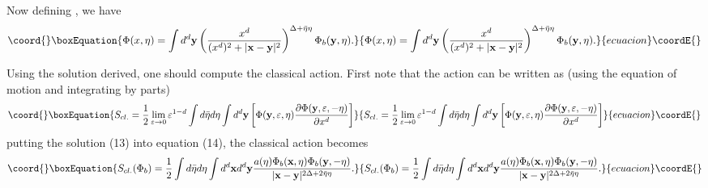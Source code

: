 \documentclass[a4paper,11pt]{article}
\begin{document}
Now defining
\coordHE{}, we have
\begin{equation}\coord{}\boxEquation{
\Phi(x,\eta)=\int d^d \mathbf{y}
\left(\frac{x^d}{(x^d)^2+|\mathbf{x-y}|^2} \right)^
{\Delta+\bar{\eta}\eta} \Phi_b(\mathbf{y},\eta).
}{
\Phi(x,\eta)=\int d^d \mathbf{y}
\left(\frac{x^d}{(x^d)^2+|\mathbf{x-y}|^2} \right)^
{\Delta+\bar{\eta}\eta} \Phi_b(\mathbf{y},\eta).
}{ecuacion}\coordE{}\end{equation}

Using the solution derived, one should compute the classical action. First
note that the action can be written as (using the equation of motion and
integrating by parts)
\begin{equation}\coord{}\boxEquation{  \label{j}
S_{cl.}=\frac{1}{2} \lim_{\varepsilon\rightarrow 0}
\varepsilon^{1-d} \int d \bar{\eta}d \eta \int d^d \mathbf{y}
\left[\Phi(\mathbf{y},\varepsilon,\eta) \frac{\partial
\Phi(\mathbf{y},\varepsilon,-\eta)}{\partial x^d}\right]
}{  S_{cl.}=\frac{1}{2} \lim_{\varepsilon\rightarrow 0}
\varepsilon^{1-d} \int d \bar{\eta}d \eta \int d^d \mathbf{y}
\left[\Phi(\mathbf{y},\varepsilon,\eta) \frac{\partial
\Phi(\mathbf{y},\varepsilon,-\eta)}{\partial x^d}\right]
}{ecuacion}\coordE{}\end{equation}
putting the solution (13) into equation (14), the classical
action becomes
\begin{equation}\coord{}\boxEquation{  \label{dd}
S_{cl.}(\Phi_b)=\frac{1}{2}\int d \bar{\eta}d \eta \int d^d
\mathbf{x} d^d \mathbf{y} \frac{a(\eta)
\Phi_b(\mathbf{x},\eta)\Phi_b(\mathbf{y},-\eta)}{|
\mathbf{x-y}|^{2\Delta+2\bar{\eta}\eta}}.
}{  S_{cl.}(\Phi_b)=\frac{1}{2}\int d \bar{\eta}d \eta \int d^d
\mathbf{x} d^d \mathbf{y} \frac{a(\eta)
\Phi_b(\mathbf{x},\eta)\Phi_b(\mathbf{y},-\eta)}{|
\mathbf{x-y}|^{2\Delta+2\bar{\eta}\eta}}.
}{ecuacion}\coordE{}\end{equation}
\end{document}
